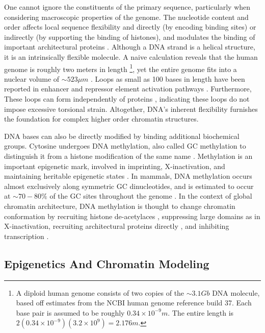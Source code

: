 One cannot ignore the constituents of the primary sequence, particularly when considering macroscopic properties of the genome.  The nucleotide content and
order affects local sequence flexibility and directly (by encoding binding sites) or indirectly (by supporting the binding of histones), and
modulates the binding of important architectural proteins \citep{travers2004}.  Although a \gls{DNA} strand is a helical structure, it is an intrinsically
flexible molecule.  A naive calculation reveals that the human genome is roughly two meters in length%
\footnote{%
  A diploid human genome consists of two copies of the $\sim3.1Gb$ DNA molecule, based off estimates from the \gls{NCBI} human genome reference build 37.
  Each base pair is assumed to be roughly $0.34\times10^{-9}m$.  The entire length is $2(0.34 \times 10^{-9})(3.2 \times 10^9) = 2.176m$.
},
yet the entire genome fits into a nuclear volume of $\sim523\mu{}m$ \citep{marks2011}.  Loops as small as 100 bases in length have been
reported in enhancer and repressor element activation pathways \citep{wong2008}.  Furthermore, These loops can form independently of proteins
\citep{vafabakhsh2012}, indicating these loops do not impose excessive torsional strain.  Altogether, \gls{DNA}'s inherent flexibility furnishes the
foundation for complex higher order chromatin structures.

\gls{DNA} bases can also be directly modified by binding additional biochemical groups.  Cytosine undergoes \gls{DNA} methylation, also called GC methylation
to distinguish it from a histone modification of the same name \citep{bird2002}.  Methylation is an important epigenetic mark, involved in imprinting,
\gls{X-inactivation}, and maintaining heritable epigenetic states \citep{law2010}.  In mammals, \gls{DNA} methylation occurs almost exclusively along
symmetric \gls{GC} dinucleotides, and is estimated to occur at $\sim70-80\%$ of the \gls{GC} sites throughout the genome \citep{ehrlich1982,law2010}.
In the context of global chromatin architecture, \gls{DNA} methylation is thought to change chromatin conformation by recruiting histone
de-acetylaces \citep{schubeler2000}, suppressing large domains as in X-inactivation, recruiting architectural proteins directly \citep{yu2000},
and inhibiting transcription \citep{kass1997}.

\subsection*{Epigenetics And Chromatin Modeling}

